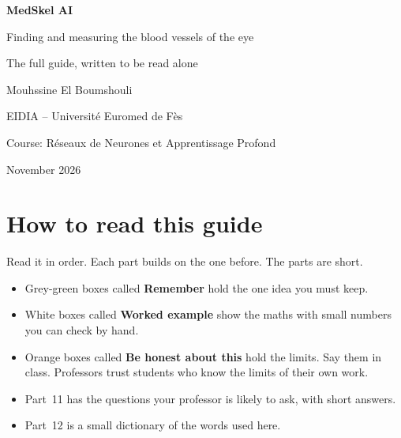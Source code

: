 \documentclass[11pt,a4paper]{article}
\begin{document}
\begin{titlepage}
\centering
\vspace*{3cm}
{\Huge\bfseries\color{teal} MedSkel AI\par}
\vspace{0.6cm}
{\Large Finding and measuring the blood vessels of the eye\par}
\vspace{0.4cm}
{\large The full guide, written to be read alone\par}
\vspace{2cm}
\vfill
{\large Mouhssine El Boumshouli\par}
{EIDIA -- Université Euromed de Fès\par}
{Course: Réseaux de Neurones et Apprentissage Profond\par}
\vspace{0.3cm}
{\small November 2026\par}
\end{titlepage}

\section*{How to read this guide}
Read it in order. Each part builds on the one before. The parts are short.

\begin{itemize}
  \item Grey-green boxes called \textbf{Remember} hold the one idea you must keep.
  \item White boxes called \textbf{Worked example} show the maths with small numbers you can check by hand.
  \item Orange boxes called \textbf{Be honest about this} hold the limits. Say them in class. Professors trust students who know the limits of their own work.
  \item Part~11 has the questions your professor is likely to ask, with short answers.
  \item Part~12 is a small dictionary of the words used here.
\end{itemize}
\end{document}
